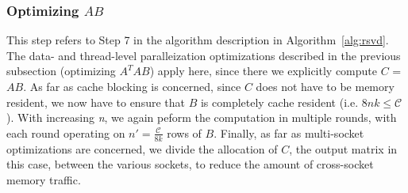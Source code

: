     




\subsubsection{Optimizing $AB$}

    This step refers to Step 7 in the algorithm description in
    Algorithm~\ref{alg:rsvd}. The data- and thread-level paralleization optimizations described 
    in the previous subsection (optimizing $A^TAB$) apply here, since
    there we explicitly  compute $C$ = $AB$. As far as cache blocking is
    concerned, since $C$ does not have to be memory resident, we now have
    to ensure that $B$ is completely cache resident (i.e. $8nk\le
    \mathcal{C}$). With increasing {\it{n}}, we again peform the
    computation in multiple rounds, with each round operating on 
    $n'=\frac{\mathcal{C}}{8k}$ rows of $B$.
    Finally, as far as multi-socket optimizations are concerned, we
    divide the allocation of $C$, the output matrix in this case,
    between the various sockets, to reduce the amount of cross-socket
    memory traffic.





\iffalse
\begin{itemize}
\item Cache-Friendly 
\item SIMD
\item Thread- or core-level
\item Multi-socket 
\end{itemize}
\fi

